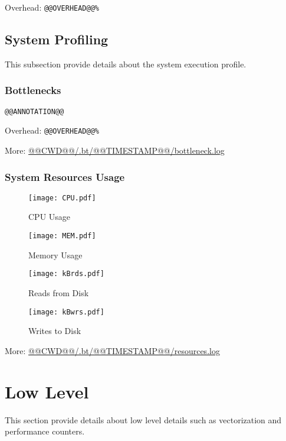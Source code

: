 \documentclass[a4paper]{article}
\begin{document}
Overhead: {\tt @@OVERHEAD@@\%}

\subsection{System Profiling}

This subsection provide details about the system execution profile.

\subsubsection{Bottlenecks}

\begin{verbatim}
@@ANNOTATION@@
\end{verbatim}

Overhead: {\tt @@OVERHEAD@@\%}

More: \url{@@CWD@@/.bt/@@TIMESTAMP@@/bottleneck.log}

\subsubsection{System Resources Usage}

\begin{figure}[H]
\label{fig:cpu}
\centering
\texttt{[image: CPU.pdf]}
\caption{CPU Usage}
\end{figure}

\begin{figure}[H]
\label{fig:memory}
\centering
\texttt{[image: MEM.pdf]}
\caption{Memory Usage}
\end{figure}

\begin{figure}[H]
\label{fig:reads}
\centering
\texttt{[image: kBrds.pdf]}
\caption{Reads from Disk}
\end{figure}

\begin{figure}[H]
\label{fig:writes}
\centering
\texttt{[image: kBwrs.pdf]}
\caption{Writes to Disk}
\end{figure}

More: \url{@@CWD@@/.bt/@@TIMESTAMP@@/resources.log}

\section{Low Level}

This section provide details about low level details such as vectorization and performance counters.
\end{document}
